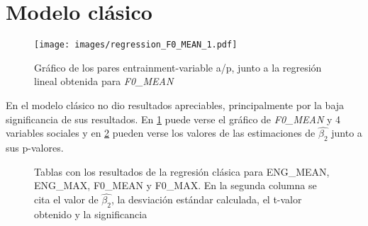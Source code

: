 \section{Modelo clásico}

\begin{figure}[t!]
\texttt{[image: images/regression\_F0\_MEAN\_1.pdf]}
\caption{Gráfico de los pares entrainment-variable a/p, junto a la regresión lineal obtenida \label{regresion_clasica} para \emph{F0\_MEAN}}
\end{figure}

En el modelo clásico no dio resultados apreciables, principalmente por la baja significancia de sus resultados. En \ref{regresion_clasica} puede verse el gráfico de \emph{F0\_MEAN} y 4 variables sociales y en \ref{regresion_clasica_tabla} pueden verse los valores de las estimaciones de $\widehat{\beta_2}$ junto a sus p-valores.


\begin{figure}[l]

\caption{Tablas con los resultados de la regresión clásica para ENG\_MEAN, ENG\_MAX, F0\_MEAN y F0\_MAX. En la segunda columna se cita el valor de $\widehat{\beta_2}$, la desviación estándar calculada, el t-valor obtenido y la significancia}\label{regresion_clasica_tabla}
\end{figure}


